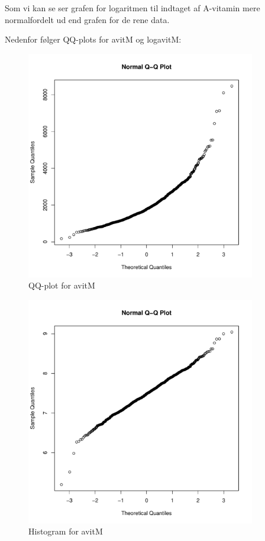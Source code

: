 Som vi kan se ser grafen for logaritmen til indtaget af A-vitamin mere
normalfordelt ud end grafen for de rene data.

Nedenfor følger QQ-plots for avitM og logavitM:

\begin{figure}[H]
\label{fig:anal6}
\begin{center}
\includegraphics[width=10cm]{graphs/analyse_2.pdf}
\caption{QQ-plot for avitM}
\end{center}
\end{figure}

\begin{figure}[H]
\label{fig:anal7}
\begin{center}
\includegraphics[width=10cm]{graphs/analyse_4.pdf}
\caption{Histogram for avitM}
\end{center}
\end{figure}

